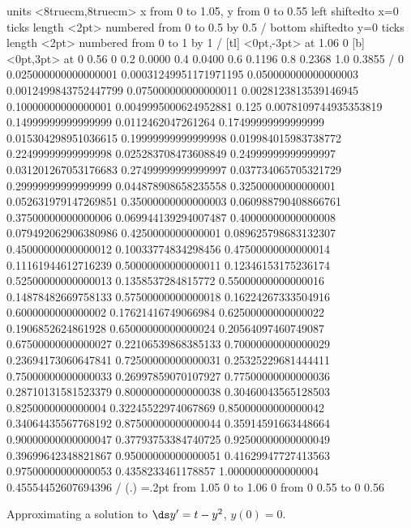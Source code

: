 \begin{solution}
\figure[H]
\centerline{\vbox{\beginpicture
\normalgraphs
\setcoordinatesystem units <8truecm,8truecm>
\setplotarea x from 0 to 1.05, y from 0 to 0.55
\axis left shiftedto x=0 ticks length <2pt> numbered from 0 to 0.5 by 0.5 /
\axis bottom shiftedto y=0 ticks length <2pt> numbered from 0 to 1 by 1 /
 [tl] <0pt,-3pt> at 1.06 0
 [b] <0pt,3pt> at 0 0.56
\setlinear
{} 0
0.2 0.0000
0.4 0.0400
0.6 0.1196
0.8 0.2368
1.0 0.3855 /
\setquadratic
{}  0  
0.025000000000000001  0.00031249951171971195 
0.050000000000000003  0.0012499843752447799  
0.075000000000000011 0.0028123813539146945  
0.10000000000000001 0.0049995000624952881  
0.125  0.0078109744935353819 
0.14999999999999999  0.0112462047261264  
0.17499999999999999 0.015304298951036615  
0.19999999999999998  0.019984015983738772 
0.22499999999999998  0.025283708473608849  
0.24999999999999997 0.031201267053176683  
0.27499999999999997  0.037734065705321729 
0.29999999999999999  0.044878908658235558  
0.32500000000000001 0.052631979147269851  
0.35000000000000003  0.060988790408866761 
0.37500000000000006  0.069944139294007487  
0.40000000000000008 0.079492062906380986  
0.4250000000000001  0.089625798683132307 
0.45000000000000012  0.10033774834298456  
0.47500000000000014 0.11161944612716239  
0.50000000000000011  0.12346153175236174 
0.52500000000000013  0.1358537284815772  
0.55000000000000016 0.14878482669758133  
0.57500000000000018  0.16224267333504916 
0.6000000000000002  0.17621416749066984  
0.62500000000000022 0.1906852624861928  
0.65000000000000024  0.20564097460749087 
0.67500000000000027  0.22106539868385133  
0.70000000000000029 0.23694173060647841  
0.72500000000000031  0.25325229681444411 
0.75000000000000033  0.26997859070107927  
0.77500000000000036 0.28710131581523379  
0.80000000000000038  0.30460043565128503 
0.8250000000000004  0.32245522974067869  
0.85000000000000042 0.34064435567768192  
0.87500000000000044  0.35914591663448664 
0.90000000000000047  0.37793753384740725  
0.92500000000000049 0.39699642348821867  
0.95000000000000051  0.41629947727413563 
0.97500000000000053  0.4358233461178857  
1.0000000000000004 0.45554452607694396 /
\setplotsymbol ({\small.})
\plotsymbolspacing=.2pt
\arrow <4pt> [0.35, 1] from 1.05 0 to 1.06 0
\arrow <4pt> [0.35, 1] from 0 0.55 to 0 0.56
\endpicture}}
\caption{\label{fig:euler method vs rk}
Approximating a solution to $\ds y'=t-y^2$, $y(0)=0$.}
\endfigure


\end{solution}
